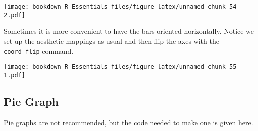 \documentclass[]{book}
\newenvironment{Shaded}{\begin{snugshade}}{\end{snugshade}}
\newcommand{\KeywordTok}[1]{\textcolor[rgb]{0.13,0.29,0.53}{\textbf{#1}}}
\newcommand{\DataTypeTok}[1]{\textcolor[rgb]{0.13,0.29,0.53}{#1}}
\newcommand{\DecValTok}[1]{\textcolor[rgb]{0.00,0.00,0.81}{#1}}
\newcommand{\StringTok}[1]{\textcolor[rgb]{0.31,0.60,0.02}{#1}}
\newcommand{\CommentTok}[1]{\textcolor[rgb]{0.56,0.35,0.01}{\textit{#1}}}
\newcommand{\OperatorTok}[1]{\textcolor[rgb]{0.81,0.36,0.00}{\textbf{#1}}}
\newcommand{\NormalTok}[1]{#1}
\begin{document}
\texttt{[image: bookdown-R-Essentials\_files/figure-latex/unnamed-chunk-54-2.pdf]}

Sometimes it is more convenient to have the bars oriented horizontally.
Notice we set up the aesthetic mappings as usual and then flip the axes
with the \texttt{coord\_flip} command.

\begin{Shaded}
\end{Shaded}

\texttt{[image: bookdown-R-Essentials\_files/figure-latex/unnamed-chunk-55-1.pdf]}

\subsection{Pie Graph}\label{pie-graph}

Pie graphs are not recommended, but the code needed to make one is given
here.
\end{document}
